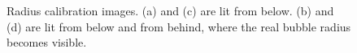 \begin{figure}
				\caption{Radius calibration images. (a) and (c) are lit from below. (b) and (d) are lit from below and from behind, where the real bubble radius becomes visible. }
				\label{fig:radius_calibration_setup_result}
			\end{figure}

































